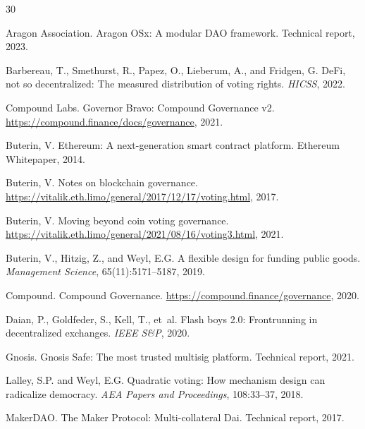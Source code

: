 \documentclass[11pt,letterpaper]{article}
\begin{document}
\begin{thebibliography}{30}

Aragon Association.
\newblock Aragon OSx: A modular DAO framework.
\newblock Technical report, 2023.

Barbereau, T., Smethurst, R., Papez, O., Lieberum, A., and Fridgen, G.
\newblock DeFi, not so decentralized: The measured distribution of voting rights.
\newblock \emph{HICSS}, 2022.

Compound Labs.
\newblock Governor Bravo: Compound Governance v2.
\newblock \url{https://compound.finance/docs/governance}, 2021.

Buterin, V.
\newblock Ethereum: A next-generation smart contract platform.
\newblock Ethereum Whitepaper, 2014.

Buterin, V.
\newblock Notes on blockchain governance.
\newblock \url{https://vitalik.eth.limo/general/2017/12/17/voting.html}, 2017.

Buterin, V.
\newblock Moving beyond coin voting governance.
\newblock \url{https://vitalik.eth.limo/general/2021/08/16/voting3.html}, 2021.

Buterin, V., Hitzig, Z., and Weyl, E.G.
\newblock A flexible design for funding public goods.
\newblock \emph{Management Science}, 65(11):5171--5187, 2019.

Compound.
\newblock Compound Governance.
\newblock \url{https://compound.finance/governance}, 2020.

Daian, P., Goldfeder, S., Kell, T., et~al.
\newblock Flash boys 2.0: Frontrunning in decentralized exchanges.
\newblock \emph{IEEE S\&P}, 2020.

Gnosis.
\newblock Gnosis Safe: The most trusted multisig platform.
\newblock Technical report, 2021.

Lalley, S.P. and Weyl, E.G.
\newblock Quadratic voting: How mechanism design can radicalize democracy.
\newblock \emph{AEA Papers and Proceedings}, 108:33--37, 2018.

MakerDAO.
\newblock The Maker Protocol: Multi-collateral Dai.
\newblock Technical report, 2017.


\end{thebibliography}
\end{document}
